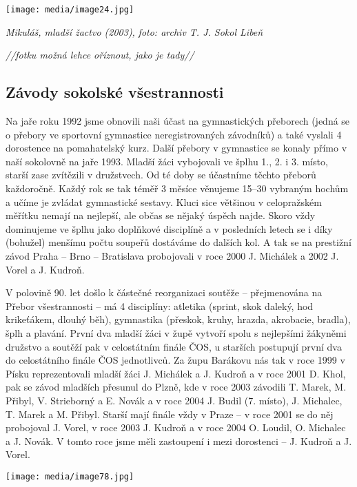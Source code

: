 \texttt{[image: media/image24.jpg]}

\emph{Mikuláš, mladší žactvo (2003),} \emph{foto: archiv T. J. Sokol
Libeň}

\emph{//fotku možná lehce oříznout, jako je tady//}

\subsection{Závody sokolské
všestrannosti}\label{zuxe1vody-sokolskuxe9-vux161estrannosti}

Na jaře roku 1992 jsme obnovili naši účast na gymnastických přeborech
(jedná se o přebory ve sportovní gymnastice neregistrovaných závodníků)
a také vyslali 4 dorostence na pomahatelský kurz. Další přebory v
gymnastice se konaly přímo v naší sokolovně na jaře 1993. Mladší žáci
vybojovali ve šplhu 1., 2. i 3. místo, starší zase zvítězili v
družstvech. Od té doby se účastníme těchto přeborů každoročně. Každý rok
se tak téměř 3 měsíce věnujeme 15--30 vybraným hochům a učíme je zvládat
gymnastické sestavy. Kluci sice většinou v celopražském měřítku nemají
na nejlepší, ale občas se nějaký úspěch najde. Skoro vždy dominujeme ve
šplhu jako doplňkové disciplíně a v posledních letech se i díky
(bohužel) menšímu počtu soupeřů dostáváme do dalších kol. A tak se na
prestižní závod Praha -- Brno -- Bratislava probojovali v roce 2000 J.
Michálek a 2002 J. Vorel a J. Kudroň.

V polovině 90. let došlo k částečné reorganizaci soutěže -- přejmenována
na Přebor všestrannosti -- má 4 disciplíny: atletika (sprint, skok
daleký, hod krikeťákem, dlouhý běh), gymnastika (přeskok, kruhy, hrazda,
akrobacie, bradla), šplh a plavání. První dva mladší žáci v župě vytvoří
spolu s nejlepšími žákyněmi družstvo a soutěží pak v celostátním finále
ČOS, u starších postupují první dva do celostátního finále ČOS
jednotlivců. Za župu Barákovu nás tak v roce 1999 v Písku reprezentovali
mladší žáci J. Michálek a J. Kudroň a v roce 2001 D. Khol, pak se závod
mladších přesunul do Plzně, kde v roce 2003 závodili T. Marek, M.
Přibyl, V. Strieborný a E. Novák a v roce 2004 J. Budil (7. místo), J.
Michalec, T. Marek a M. Přibyl. Starší mají finále vždy v Praze -- v
roce 2001 se do něj probojoval J. Vorel, v roce 2003 J. Kudroň a v roce
2004 O. Loudil, O. Michalec a J. Novák. V tomto roce jsme měli
zastoupení i mezi dorostenci -- J. Kudroň a J. Vorel.

\texttt{[image: media/image78.jpg]}

